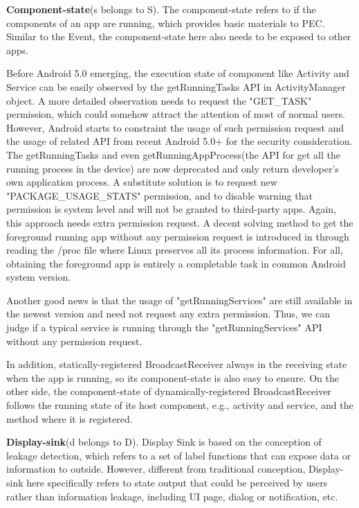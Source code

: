 \documentclass{sig-alternate-05-2015}
\begin{document}
\textbf{Component-state}(s belongs to S). The component-state refers to if the components of an app are running, which provides basic materials to PEC. Similar to the Event, the component-state here also needs to be exposed to other apps.

Before {\color{red}Android 5.0} emerging, the execution state of component like Activity and Service can be easily observed by the {\color{red}getRunningTasks API in ActivityManager object}. A more detailed observation needs to request the "GET\_TASK" permission, which could somehow attract the attention of most of normal users. However, Android starts to constraint the usage of such permission request and the usage of related API from recent {\color{red}Android 5.0+} for the security consideration. The getRunningTasks and even getRunningAppProcess(the API for get all the running process in the device) are now deprecated and only return developer's own application process. {\color{red}A substitute solution is to request new "PACKAGE\_USAGE\_STATS" permission, and to disable warning that permission is system level and will not be granted to third-party apps. Again, this approach needs extra permission request. } A decent solving method to get the foreground running app without any permission request is introduced in  \cite{getforeground} through reading the /proc file where Linux preserves all its process information. For all, obtaining the foreground app is entirely a completable task in common Android system version. 

Another good news is that the usage of  "getRunningServices" are still available in the newest version and need not request any extra permission. Thus, we can judge if a typical service is running through the "getRunningServices" API without any permission request. 

In addition, statically-registered BroadcastReceiver always in the receiving state when the app is running, so its component-state is also easy to ensure. On the other side, the component-state of dynamically-registered BroadcastReceiver follows the running state of its host component, e.g., activity and service, and the method where it is registered.


\textbf{Display-sink}(d belongs to D). Display Sink is based on the conception of leakage detection, which refers to a set of label functions that can expose data or information to outside. However, different from traditional conception, Display-sink here specifically refers to state output that could be perceived by users rather than information leakage, including UI page, dialog or notification, etc.
\end{document}
